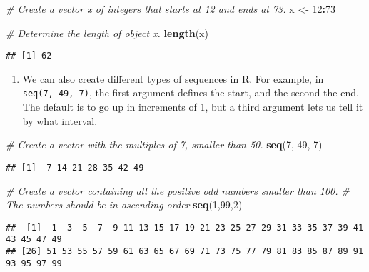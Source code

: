 \documentclass[]{article}
\newenvironment{Shaded}{\begin{snugshade}}{\end{snugshade}}
\newcommand{\CommentTok}[1]{\textcolor[rgb]{0.56,0.35,0.01}{\textit{#1}}}
\newcommand{\DecValTok}[1]{\textcolor[rgb]{0.00,0.00,0.81}{#1}}
\newcommand{\KeywordTok}[1]{\textcolor[rgb]{0.13,0.29,0.53}{\textbf{#1}}}
\newcommand{\NormalTok}[1]{#1}
\newcommand{\OperatorTok}[1]{\textcolor[rgb]{0.81,0.36,0.00}{\textbf{#1}}}
\newcommand{\StringTok}[1]{\textcolor[rgb]{0.31,0.60,0.02}{#1}}
\providecommand{\tightlist}{%
  \setlength{\itemsep}{0pt}\setlength{\parskip}{0pt}}
\begin{document}
\begin{Shaded}
\begin{Highlighting}[]
\CommentTok{# Create a vector x of integers that starts at 12 and ends at 73.}
\NormalTok{x <-}\StringTok{ }\DecValTok{12}\OperatorTok{:}\DecValTok{73}

\CommentTok{# Determine the length of object x.}
\KeywordTok{length}\NormalTok{(x)}
\end{Highlighting}
\end{Shaded}

\begin{verbatim}
## [1] 62
\end{verbatim}

\begin{enumerate}
\def\labelenumi{\arabic{enumi}.}
\setcounter{enumi}{6}
\tightlist
\item
  We can also create different types of sequences in R. For example, in
  \texttt{seq(7,\ 49,\ 7)}, the first argument defines the start, and
  the second the end. The default is to go up in increments of 1, but a
  third argument lets us tell it by what interval.
\end{enumerate}

\begin{Shaded}
\begin{Highlighting}[]
\CommentTok{# Create a vector with the multiples of 7, smaller than 50.}
\KeywordTok{seq}\NormalTok{(}\DecValTok{7}\NormalTok{, }\DecValTok{49}\NormalTok{, }\DecValTok{7}\NormalTok{) }
\end{Highlighting}
\end{Shaded}

\begin{verbatim}
## [1]  7 14 21 28 35 42 49
\end{verbatim}

\begin{Shaded}
\begin{Highlighting}[]
\CommentTok{# Create a vector containing all the positive odd numbers smaller than 100.}
\CommentTok{# The numbers should be in ascending order}
\KeywordTok{seq}\NormalTok{(}\DecValTok{1}\NormalTok{,}\DecValTok{99}\NormalTok{,}\DecValTok{2}\NormalTok{)}
\end{Highlighting}
\end{Shaded}

\begin{verbatim}
##  [1]  1  3  5  7  9 11 13 15 17 19 21 23 25 27 29 31 33 35 37 39 41 43 45 47 49
## [26] 51 53 55 57 59 61 63 65 67 69 71 73 75 77 79 81 83 85 87 89 91 93 95 97 99
\end{verbatim}
\end{document}
